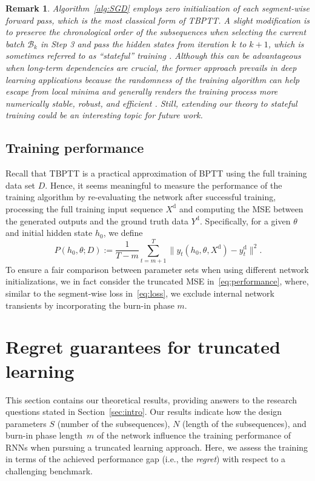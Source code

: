 \documentclass{article} %
\newtheorem{rem}{Remark}
\begin{document}
\begin{rem}\label{rem:stateful}
	Algorithm~\ref{alg:SGD} employs zero initialization of each segment-wise forward pass, which is the most classical form of TBPTT.
	A slight modification is to preserve the chronological order of the subsequences when selecting the current batch $\mathcal{B}_k$ in Step 3 and pass the hidden states from iteration $k$ to $k+1$, which is sometimes referred to as ``stateful'' training \citep{Katrompas2021,Elsworth2020,Xu2023a}. Although this can be advantageous when long-term dependencies are crucial, the former approach prevails in deep learning applications because the randomness of the training algorithm can help escape from local minima and generally renders the training process more numerically stable, robust, and efficient \citep{Xu2023a,AllenZhu2019}. Still, extending our theory to stateful training could be an interesting topic for future work.
\end{rem}

\subsection{Training performance}\label{sec:performance_metric}

Recall that TBPTT is a practical approximation of BPTT using the full training data set $D$. Hence, it seems meaningful to measure the performance of the training algorithm by re-evaluating the network after successful training, processing the full training input sequence $X^\mathrm{d}$ and computing the MSE between the generated outputs and the ground truth data $Y^\mathrm{d}$.
Specifically, for a given $\theta$ and initial hidden state $h_0$, we define
\begin{equation}\label{eq:performance}
	P(h_0,\theta;D) := \frac{1}{T-m}\sum_{t=m+1}^{T}\|y_t(h_0,\theta,X^\mathrm{d})-y^\mathrm{d}_t\|^2.
\end{equation}
To ensure a fair comparison between parameter sets when using different network initializations, we in fact consider the truncated MSE in~\eqref{eq:performance}, where, similar to the segment-wise loss in~\eqref{eq:loss}, we exclude internal network transients by incorporating the burn-in phase $m$.

\section{Regret guarantees for truncated learning}\label{sec:results}

This section contains our theoretical results, providing answers to the research questions stated in Section~\ref{sec:intro}.
Our results indicate how the design parameters $S$ (number of the subsequences), $N$ (length of the subsequences), and burn-in phase length~$m$ of the network influence the training performance of RNNs when pursuing a truncated learning approach.
Here, we assess the training in terms of the achieved performance gap (i.e., the \emph{regret}) with respect to a challenging benchmark.
\end{document}
